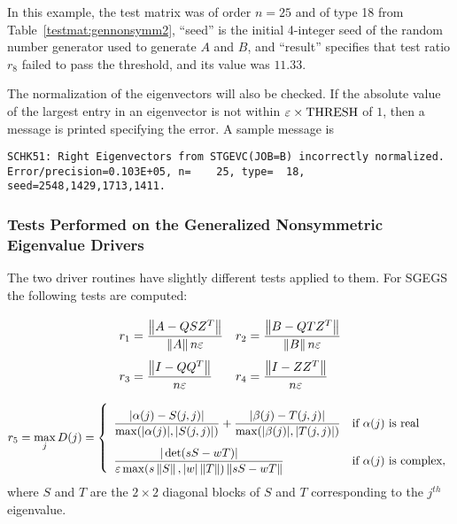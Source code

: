 \noindent
In this example, the test matrix was of order $n = 25$
and of type 18 from Table~\ref{testmat:gennonsymm2}, 
``seed'' is the initial 4-integer seed of the random number generator
used to generate $A$ and $B$, and
``result'' specifies that test ratio $r_8$ failed to pass the
threshold, and its value was $11.33$.

The normalization of the eigenvectors will also be checked.
If the absolute value of the largest entry in an eigenvector is
not within $\varepsilon\times{\rm THRESH}$ of $1$, then
a message is printed specifying the error.
A sample message is
\begin{verbatim}
SCHK51: Right Eigenvectors from STGEVC(JOB=B) incorrectly normalized.
Error/precision=0.103E+05, n=    25, type=  18, seed=2548,1429,1713,1411.
\end{verbatim}

\subsubsection{Tests Performed on the
               Generalized Nonsymmetric Eigenvalue Drivers}

\dent
The two driver routines have slightly different tests applied to them.
For SGEGS the following tests are computed:
\begin{displaymath}
   \bigarray
   \renewcommand{\arraystretch}{2.7}
   \begin{array}{ll}
         r_1 = \frac{\leftnorm A - Q S Z^T  \rightnorm} 
                 { \leftnorm A \rightnorm n \varepsilon } &
         r_2 = \frac{\leftnorm B - Q T Z^T  \rightnorm} 
                 { \leftnorm B \rightnorm n \varepsilon } \\
         r_3 = \frac{\leftnorm I - QQ^T  \rightnorm}
                 { n \varepsilon } &
         r_4 = \frac{\leftnorm I - ZZ^T  \rightnorm} 
                 { n \varepsilon }
   \end{array}
\end{displaymath}
\begin{displaymath}
  r_5 = \max_j D(j) = \left\{
     \begin{array}{ll}
       \frac{|  \alpha(j) - S(j,j) |} {\max(| \alpha(j) |,|  S(j,j) | )} +
       \frac{|  \beta(j) - T(j,j) |} {\max(| \beta(j) |,|  T(j,j) | )}
       & \mbox{if $\alpha(j)$ is real} \\
       \frac{|  \det( s S - w T )  |}
            {\varepsilon \max ( s \leftnorm S\rightnorm, |w| \leftnorm
             T\rightnorm ) \leftnorm s S - w T \rightnorm}
       & \mbox{if $\alpha(j)$ is complex},
    \end{array}
        \right.
\end{displaymath}
where $S$ and $T$ are the $2 \times 2$ diagonal blocks of $S$ and $T$
corresponding to the $j^{th}$ eigenvalue.

